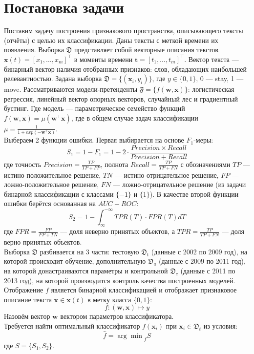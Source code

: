 \documentclass[12pt, twoside]{article}
\begin{document}
\section{Постановка задачи}

Поставим задачу построения признакового пространства, описывающего тексты (отчёты) с целью их классификации. Даны тексты с меткой времени их появления. Выборка $\mathfrak{D}$ представляет собой векторные описания текстов $\mathbf{x}(t) = [x_1, \dots, x_m]^\top$ в моменты времени $\mathbf{t} = [t_1, \dots, t_m]^\top$. Вектор текста --- бинарный вектор наличия отобранных признаков: слов, обладающих наибольшей релевантностью. Задана выборка $\mathfrak{D} = \{(\mathbf{x}_i, y_i)\}$, где $y \in \{0, 1\}$, 0 --- stay, 1 --- move. Рассматриваются модели-претенденты $\mathfrak{F} = \{f(\mathbf{w, x})\}$: логистическая регрессия, линейный вектор опорных векторов, случайный лес и градиентный бустинг. Где модель --- параметрическое семейство функций $f(\mathbf{w, x}) = \mu (\mathbf{w}^\top \mathbf{x})$, где в общем случае задач классификации $\mu = \frac{1}{1 + exp(-\mathbf{w}^\top \mathbf{x})}$. \\
Выбераем 2 функции ошибки. Первая выбирается на основе $F_1$-меры: $$S_1 = 1 - F_1 = 1 - 2 \cdot \frac{Precision \times Recall}{Precision + Recall}$$ где точность $Precision = \frac{TP}{TP + FP}$, полнота $Recall = \frac{TP}{TP + FN}$ с обозначениями $TP$ --- истино-положительное решение, $TN$ --- истино-отрицательное решение, $FP$ --- ложно-положительное решение, $FN$ --- ложно-отрицательное решение (из задачи бинарной классификации с классами $\{-1\}$ и $\{1\}$). В качестве второй функции ошибки берётся основанная на $AUC-ROC$: $$S_2 = 1 - \int_\infty^{-\infty} {TPR(T) \cdot FPR(T) dT}$$ где $FPR = \frac{FP}{FP + TN}$ --- доля неверно принятых объектов, а $TPR = \frac{TP}{TP + FN}$ --- доля верно принятых объектов.\\
Выборка $\mathfrak{D}$ разбивается на 3 части: тестовую $\mathfrak{D}_t$ (данные с 2002 по 2009 год), на которой происходит обучение, дополнительную $\mathfrak{D}_a$ (данные с 2009 по 2011 год), на которой донастраиваются параметры и контрольной $\mathfrak{D}_c$ (данные с 2011 по 2013 год), на которой производится контроль качества построенных моделей.\\
Отображение $f$ является бинарной классификацией и отображает признаковое описание текста $\mathbf{x} \in \mathbf{x}(t)$ в метку класса $\{0, 1\}$: $$f: (\mathbf{w, x}) \mapsto y$$ Назовём вектор $\mathbf{w}$ вектором параметров классификатора.\\
Требуется найти оптимальный классификатор $f(\mathbf{x}_i)$ при $\mathbf{x}_i \in \mathfrak{D}_t$ из условия: $$\hat{f} = {\arg\!\min}_{f} S$$
где $S = \{S_1, S_2\}$. 
\end{document}
